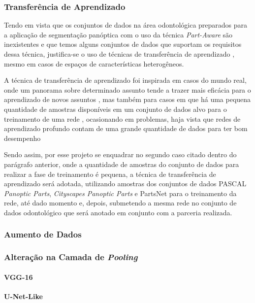 \subsubsection{Transferência de Aprendizado}
\label{proposal:transf}
Tendo em vista que os conjuntos de dados na área odontológica preparados para a aplicação de segmentação panóptica com o uso da técnica \textit{Part-Aware} são inexistentes e que temos alguns conjuntos de dados que suportam os requisitos dessa técnica, justifica-se o uso de técnicas de transferência de aprendizado \cite{Weiss2016}, mesmo em casos de espaços de características heterogêneos.

A técnica de transferência de aprendizado foi inspirada em casos do mundo real, onde um panorama sobre determinado assunto tende a trazer mais eficácia para o aprendizado de novos assuntos \cite{Pan2010}, mas também para casos em que há uma pequena quantidade de amostras disponíveis em um conjunto de dados alvo para o treinamento de uma rede \cite{Weiss2016}, ocasionando em problemas, haja vista que redes de aprendizado profundo contam de uma grande quantidade de dados para ter bom desempenho \cite{Goodfellow2016}

Sendo assim, por esse projeto se enquadrar no segundo caso citado dentro do parágrafo anterior, onde a quantidade de amostras do conjunto de dados para realizar a fase de treinamento é pequena, a técnica de transferência de aprendizado será adotada, utilizando amostras dos conjuntos de dados PASCAL \textit{Panoptic Parts}, \textit{Cityscapes Panoptic Parts} e PartsNet para o treinamento da rede, até dado momento e, depois, submetendo a mesma rede no conjunto de dados odontológico que será anotado em conjunto com a parceria realizada.

\subsubsection{Aumento de Dados}

\subsubsection{Alteração na Camada de \textit{Pooling}}
\label{proposal:pcapooling}


\paragraph{VGG-16}

\paragraph{U-Net-Like}

